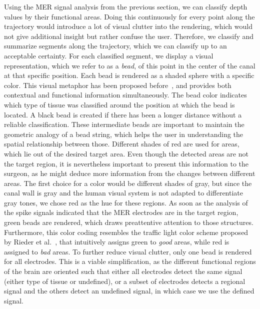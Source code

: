 \documentclass[journal]{vgtc}                %
\begin{document}
Using the MER signal analysis from the previous section, we can classify depth values by their functional areas. Doing this continuously for every point along the trajectory would introduce a lot of visual clutter into the rendering, which would not give additional insight but rather confuse the user. Therefore, we classify and summarize segments along the trajectory, which we can classify up to an acceptable certainty. For each classified segment, we display a visual representation, which we refer to as a \emph{bead}, of this point in the center of the canal at that specific position. Each bead is rendered as a shaded sphere with a specific color. This visual metaphor has been proposed before~\cite{Miocinovic2007,Haese2005}, and provides both contextual and functional information simultaneously. The bead color indicates which type of tissue was classified around the position at which the bead is located. A black bead is created if there has been a longer distance without a reliable classification. These intermediate beads are important to maintain the geometric analogy of a bead string, which helps the user in understanding the spatial relationship between those. Different shades of red are used for areas, which lie out of the desired target area. Even though the detected areas are not the target region, it is nevertheless important to present this information to the surgeon, as he might deduce more information from the changes between different areas. The first choice for a color would be different shades of gray, but since the canal wall is gray and the human visual system is not adapted to differentiate gray tones, we chose red as the hue for these regions. As soon as the analysis of the spike signals  indicated that the MER electrodes are in the target region, green beads are rendered, which draws preattentive attention to those structures. Furthermore, this color coding resembles the traffic light color scheme proposed by Rieder et al.~\cite{Rieder2010}, that intuitively assigns green to {\it good} areas, while red is assigned to {\it bad} areas. To further reduce visual clutter, only one bead is rendered for all electrodes. This is a viable simplification, as the different functional regions of the brain are oriented such that either all electrodes detect the same signal (either type of tissue or undefined), or a subset of electrodes detects a regional signal and the others detect an undefined signal, in which case we use the defined signal.
\end{document}
